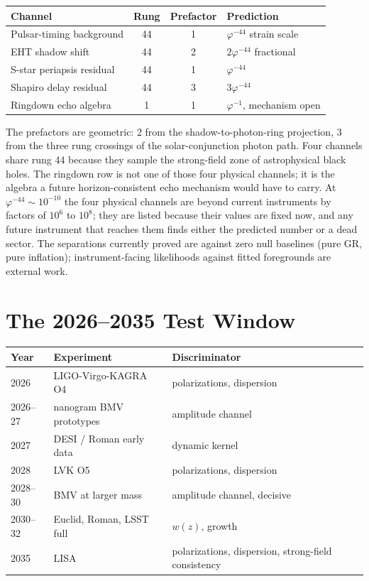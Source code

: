 \documentclass[11pt,letterpaper]{article}
\theoremstyle{definition}
\newcommand{\phiG}{\varphi}
\begin{document}
\begin{center}
\begin{tabular}{lccl}
\toprule
\textbf{Channel} & \textbf{Rung} & \textbf{Prefactor}
& \textbf{Prediction} \\
\midrule
Pulsar-timing background & 44 & 1 & $\phiG^{-44}$ strain scale \\
EHT shadow shift & 44 & 2 & $2\phiG^{-44}$ fractional \\
S-star periapsis residual & 44 & 1 & $\phiG^{-44}$ \\
Shapiro delay residual & 44 & 3 & $3\phiG^{-44}$ \\
Ringdown echo algebra & 1 & 1 & $\phiG^{-1}$, mechanism open \\
\bottomrule
\end{tabular}
\end{center}

The prefactors are geometric: 2 from the shadow-to-photon-ring
projection, 3 from the three rung crossings of the solar-conjunction
photon path.  Four channels share rung 44 because they sample the
strong-field zone of astrophysical black holes.  The ringdown row is
not one of those four physical channels; it is the algebra a future
horizon-consistent echo mechanism would have to carry.  At
$\phiG^{-44}\sim10^{-10}$ the four physical channels are beyond current
instruments by factors of $10^{6}$ to $10^{8}$; they are listed
because their values are fixed now, and any future instrument that
reaches them finds either the predicted number or a dead sector.  The
separations currently proved are against zero null baselines (pure GR,
pure inflation); instrument-facing likelihoods against fitted
foregrounds are external work.

\section{The 2026--2035 Test Window}
\label{sec:window}

\begin{center}
\begin{tabular}{lll}
\toprule
Year & Experiment & Discriminator \\
\midrule
2026 & LIGO-Virgo-KAGRA O4 & polarizations, dispersion \\
2026--27 & nanogram BMV prototypes & amplitude channel \\
2027 & DESI / Roman early data & dynamic kernel \\
2028 & LVK O5 & polarizations, dispersion \\
2028--30 & BMV at larger mass & amplitude channel, decisive \\
2030--32 & Euclid, Roman, LSST full & $w(z)$, growth \\
2035 & LISA & polarizations, dispersion, strong-field consistency \\
\bottomrule
\end{tabular}
\end{center}
\end{document}
